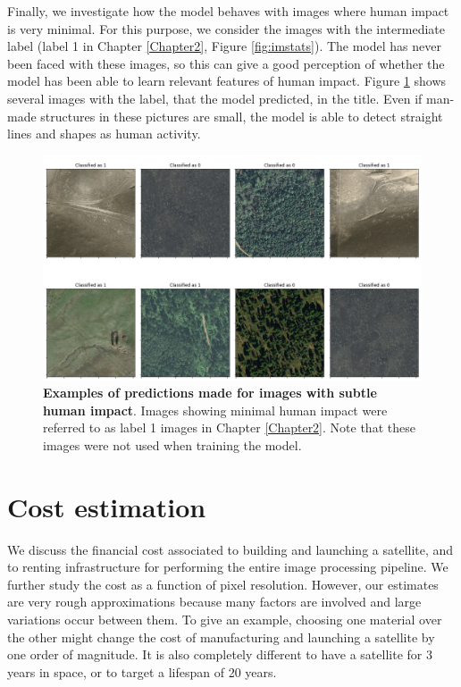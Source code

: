 Finally, we investigate how the model behaves with images where human impact is very minimal. For this purpose, we consider the images with the intermediate label (label 1 in Chapter \ref{Chapter2}, Figure \ref{fig:imstats}). The model has never been faced with these images, so this can give a good perception of whether the model has been able to learn relevant features of human impact. Figure \ref{fig:dataset03m_res03_l1} shows several images with the label, that the model predicted, in the title. Even if man-made structures in these pictures are small, the model is able to detect straight lines and shapes as human activity. 

\begin{figure}[H]
	\centering
	\captionsetup{width=1\linewidth}
	\includegraphics[width=1\textwidth]{Figures/results/class_dataset03m_res03_l1.png}
	\caption{\textbf{Examples of predictions made for images with subtle human impact}. Images showing minimal human impact were referred to as label 1 images in Chapter \ref{Chapter2}. Note that these images were not used when training the model.}
	\label{fig:dataset03m_res03_l1}
\end{figure}

\section{Cost estimation}

We discuss the financial cost associated to building and launching a satellite, and to renting infrastructure for performing the entire image processing pipeline. We further study the cost as a function of pixel resolution. However, our estimates are very rough approximations because many factors are involved and large variations occur between them. To give an example, choosing one material over the other might change the cost of manufacturing and launching a satellite by one order of magnitude. It is also completely different to have a satellite for 3 years in space, or to target a lifespan of 20 years. 

